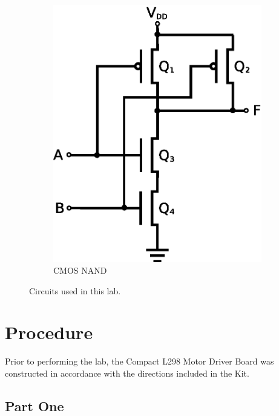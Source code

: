 \begin{figure}[hbtp]
\begin{subfigure}[b]{0.5\textwidth}
     \includegraphics[width=\textwidth]{nand}
     \caption{\label{fig:nand} CMOS NAND}
   \end{subfigure}
   \caption{\label{fig:schematics} Circuits used in this lab.}
 \end{figure}

\section{Procedure}
\label{sec:procedure}

Prior to performing the lab, the Compact L298 Motor Driver Board was constructed in accordance with the directions included in the Kit.

\subsection{Part One}
\label{sec:part_one}

